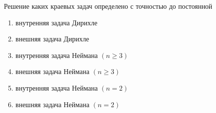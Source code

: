 Решение каких краевых задач определено с точностью до постоянной

\begin{enumerate}[label=\arabic*)]
    \item внутренняя задача Дирихле
    \item внешняя задача Дирихле
    \item внутренняя задача Неймана \((n \geq 3)\)
    \item внешняя задача Неймана \((n \geq 3)\)
    \item внутренняя задача Неймана \((n = 2)\)
    \item внешняя задача Неймана \((n = 2)\)
\end{enumerate}

